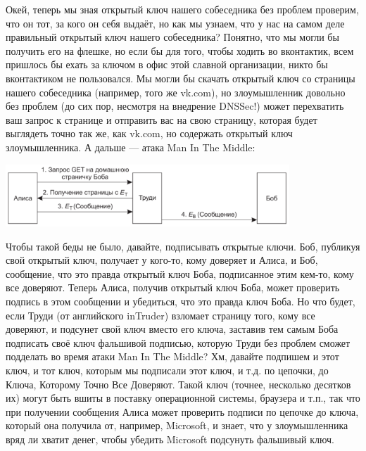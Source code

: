 \documentclass{../../text-style}
\begin{document}
Окей, теперь мы зная открытый ключ нашего собеседника без проблем проверим, что он тот, за кого он себя выдаёт, но как мы узнаем, что у нас на самом деле правильный открытый ключ нашего собеседника? Понятно, что мы могли бы получить его на флешке, но если бы для того, чтобы ходить во вконтактик, всем пришлось бы ехать за ключом в офис этой славной организации, никто бы вконтактиком не пользовался. Мы могли бы скачать открытый ключ со страницы нашего собеседника (например, того же vk.com), но злоумышленник довольно без проблем (до сих пор, несмотря на внедрение DNSSec!) может перехватить ваш запрос к странице и отправить вас на свою страницу, которая будет выглядеть точно так же, как vk.com, но содержать открытый ключ злоумышленника. А дальше --- атака Man In The Middle:

\begin{center}
    \includegraphics[width=0.8\textwidth]{manInTheMiddle.png}
\end{center}

Чтобы такой беды не было, давайте, подписывать открытые ключи. Боб, публикуя свой открытый ключ, получает у кого-то, кому доверяет и Алиса, и Боб, сообщение, что это правда открытый ключ Боба, подписанное этим кем-то, кому все доверяют. Теперь Алиса, получив открытый ключ Боба, может проверить подпись в этом сообщении и убедиться, что это правда ключ Боба. Но что будет, если Труди (от английского inTruder) взломает страницу того, кому все доверяют, и подсунет свой ключ вместо его ключа, заставив тем самым Боба подписать своё ключ фальшивой подписью, которую Труди без проблем сможет подделать во время атаки Man In The Middle? Хм, давайте подпишем и этот ключ, и тот ключ, которым мы подписали этот ключ, и т.д. по цепочки, до Ключа, Которому Точно Все Доверяют. Такой ключ (точнее, несколько десятков их) могут быть вшиты в поставку операционной системы, браузера и т.п., так что при получении сообщения Алиса может проверить подписи по цепочке до ключа, который она получила от, например, Microsoft, и знает, что у злоумышленника вряд ли хватит денег, чтобы убедить Microsoft подсунуть фальшивый ключ.
\end{document}
